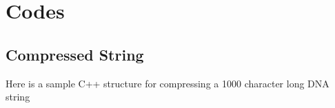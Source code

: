 \lstset{
  language=C++, %
  basicstyle=\ttfamily,
  numbers=left,
  numberstyle=\footnotesize,
  stepnumber=1, 
  numbersep=2.0mm,
  breaklines=true
}

\chapter{Codes}\label{ch:codes}

\section{Compressed String}\label{string_compress}

Here is a sample C++ structure for compressing a 1000 character long DNA string



\endinput
